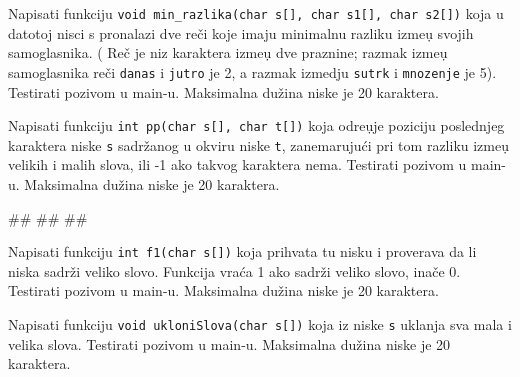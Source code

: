 \begin{Exercise}[label=p2.3_] 
Napisati funkciju
\verb|void min_razlika(char s[], char s1[], char s2[])| koja u datotoj
nisci s pronalazi dve re\v ci koje imaju minimalnu razliku izme\d u
svojih samoglasnika.  ( Re\v c je niz karaktera izme\d u dve praznine;
razmak izme\d u samoglasnika re\v ci \verb|danas| i \verb|jutro| je 2,
a razmak izmedju \verb|sutrk| i \verb|mnozenje| je 5).  Testirati
pozivom u main-u.  Maksimalna du\v zina niske je 20 karaktera.
\end{Exercise}
\begin{Answer}[ref=p2.3_]
\end{Answer}

\begin{Exercise}[label=p2.3_] 
Napisati funkciju \verb|int pp(char s[], char t[])| koja odre\d uje
poziciju poslednjeg karaktera niske \verb|s| sadr\v zanog u okviru
niske \verb|t|, zanemaruju\' ci pri tom razliku izme\d u velikih i
malih slova, ili -1 ako takvog karaktera nema.  Testirati pozivom u
main-u.  Maksimalna du\v zina niske je 20 karaktera.
\begin{miditest}
\begin{upotreba}{1}
#\naslovInt#
##
##
\end{upotreba}
\end{miditest}
\end{Exercise}
\begin{Answer}[ref=p2.3_]
\end{Answer}

\begin{Exercise}[label=p2.3_] 
Napisati funkciju \verb|int f1(char s[])| koja prihvata tu nisku i
proverava da li niska sadr\v{z}i veliko slovo. Funkcija vra\'ca 1 ako
sadr\v zi veliko slovo, ina\v ce 0.  Testirati pozivom u main-u.
Maksimalna du\v zina niske je 20 karaktera.
\end{Exercise}
\begin{Answer}[ref=p2.3_]
\end{Answer}

\begin{Exercise}[label=p2.3_] 
Napisati funkciju \verb|void ukloniSlova(char s[])| koja iz niske
\verb|s| uklanja sva mala i velika slova.  Testirati pozivom u main-u.
Maksimalna du\v zina niske je 20 karaktera.  
\end{Exercise}
\begin{Answer}[ref=p2.3_]
\end{Answer}


